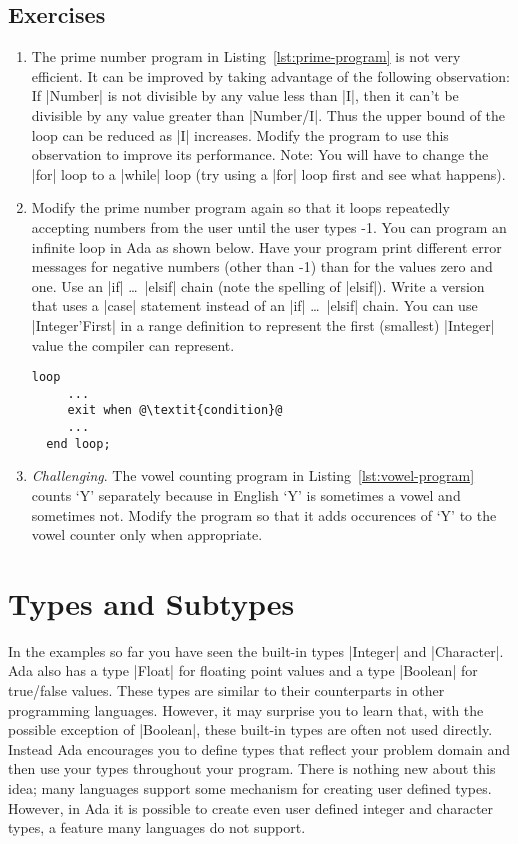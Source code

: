 \subsection*{Exercises}

\begin{enumerate}
\item The prime number program in Listing~\ref{lst:prime-program} is not very efficient. It can
  be improved by taking advantage of the following observation: If |Number| is not divisible by
  any value less than |I|, then it can't be divisible by any value greater than |Number/I|. Thus
  the upper bound of the loop can be reduced as |I| increases. Modify the program to use this
  observation to improve its performance. Note: You will have to change the |for| loop to a
  |while| loop (try using a |for| loop first and see what happens).

\item Modify the prime number program again so that it loops repeatedly accepting numbers from
  the user until the user types -1. You can program an infinite loop in Ada as shown below. Have
  your program print different error messages for negative numbers (other than -1) than for the
  values zero and one. Use an |if| \ldots\ |elsif| chain (note the spelling of |elsif|). Write a
  version that uses a |case| statement instead of an |if| \ldots\ |elsif| chain. You can use
  |Integer'First| in a range definition to represent the first (smallest) |Integer| value the
  compiler can represent.

  \begin{lstlisting}[escapechar=\@]
  loop
     ...
     exit when @\textit{condition}@
     ...
  end loop;
  \end{lstlisting}

\item \textit{Challenging}. The vowel counting program in Listing~\ref{lst:vowel-program} counts
  `Y' separately because in English `Y' is sometimes a vowel and sometimes not. Modify the
  program so that it adds occurences of `Y' to the vowel counter only when appropriate.
\end{enumerate}

\section{Types and Subtypes}

In the examples so far you have seen the built-in types |Integer| and |Character|. Ada also has
a type |Float| for floating point values and a type |Boolean| for true/false values. These types
are similar to their counterparts in other programming languages. However, it may surprise you
to learn that, with the possible exception of |Boolean|, these built-in types are often not used
directly. Instead Ada encourages you to define types that reflect your problem domain and then
use your types throughout your program. There is nothing new about this idea; many languages
support some mechanism for creating user defined types. However, in Ada it is possible to create
even user defined integer and character types, a feature many languages do not support.

